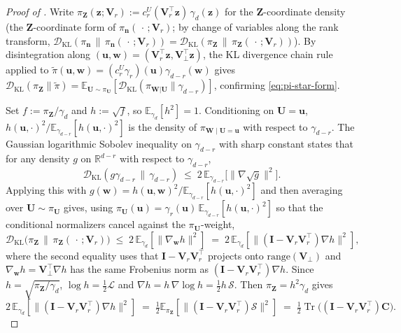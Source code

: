 \documentclass[review,hidelinks,onefignum,onetabnum]{siamart251216}
\newcommand{\RR}{\mathbb{R}}
\newcommand{\EE}{\mathbb{E}}
\newcommand{\DKL}{\mathcal{D}_{\mathrm{KL}}}
\newcommand{\tr}{\operatorname{Tr}}
\newcommand{\gauss}{\gamma}
\newcommand{\mC}{\bm{C}}
\newcommand{\mV}{\bm{V}}
\newcommand{\mI}{\bm{I}}
\newcommand{\vn}{\bm{n}}
\newcommand{\vz}{\bm{z}}
\newcommand{\vZ}{\bm{Z}}
\newcommand{\vu}{\bm{u}}
\newcommand{\vU}{\bm{U}}
\newcommand{\vw}{\bm{w}}
\newcommand{\vW}{\bm{W}}
\newcommand{\scL}{\mathcal{L}}
\newcommand{\scS}{\mathcal{S}}
\begin{document}
\begin{proof}[Proof of ]
Write $\pi_{\vZ}(\vz;\mV_r) := c_r^{U}(\mV_r^\top\vz)\,\gauss_d(\vz)$ for the $\vZ$-coordinate density (the $\vZ$-coordinate form of $\pi_{\vn}(\,\cdot\,;\mV_r)$; by change of variables along the rank transform, $\DKL(\pi_{\vn}\,\|\,\pi_{\vn}(\,\cdot\,;\mV_r)) = \DKL(\pi_{\vZ}\,\|\,\pi_{\vZ}(\,\cdot\,;\mV_r))$). By disintegration along $(\vu, \vw) = (\mV_r^\top\vz, \mV_\perp^\top\vz)$, the KL divergence chain rule applied to $\widetilde\pi(\vu, \vw) = (c_r^{U}\gauss_r)(\vu)\gauss_{d-r}(\vw)$ gives $\DKL(\pi_{\vZ}\|\widetilde\pi) = \EE_{\vU\sim\pi_{\vU}}[\DKL(\pi_{\vW|\vU}\|\gauss_{d-r})]$, confirming \eqref{eq:pi-star-form}.

Set $f := \pi_{\vZ}/\gauss_d$ and $h := \sqrt{f}$, so $\EE_{\gauss_d}[h^2] = 1$. Conditioning on $\vU = \vu$, $h(\vu, \cdot)^2 / \EE_{\gauss_{d-r}}[h(\vu,\cdot)^2]$ is the density of $\pi_{\vW\mid\vU=\vu}$ with respect to $\gauss_{d-r}$. The Gaussian logarithmic Sobolev inequality on $\gauss_{d-r}$ with sharp constant \cite[Prop.~5.5.1]{BakryGentilLedoux2014} states that for any density $g$ on $\RR^{d-r}$ with respect to $\gauss_{d-r}$,
\[
  \DKL(g\gauss_{d-r}\,\|\,\gauss_{d-r}) \;\le\; 2\,\EE_{\gauss_{d-r}}\bigl[\|\nabla\sqrt{g}\|^2\bigr].
\]
Applying this with $g(\vw) = h(\vu,\vw)^2/\EE_{\gauss_{d-r}}[h(\vu,\cdot)^2]$ and then averaging over $\vU \sim \pi_{\vU}$ gives, using $\pi_{\vU}(\vu) = \gauss_r(\vu)\,\EE_{\gauss_{d-r}}[h(\vu,\cdot)^2]$ so that the conditional normalizers cancel against the $\pi_{\vU}$-weight,
\[
  \DKL\bigl(\pi_{\vZ} \,\|\, \pi_{\vZ}(\,\cdot\,;\mV_r)\bigr)
  \;\leq\; 2\,\EE_{\gauss_d}[\|\nabla_{\vw} h\|^2]
  \;=\; 2\,\EE_{\gauss_d}[\|(\mI-\mV_r\mV_r^\top)\nabla h\|^2],
\]
where the second equality uses that $\mI-\mV_r\mV_r^\top$ projects onto $\mathrm{range}(\mV_\perp)$ and $\nabla_{\vw}h = \mV_\perp^\top\nabla h$ has the same Frobenius norm as $(\mI-\mV_r\mV_r^\top)\nabla h$. Since $h = \sqrt{\pi_{\vZ}/\gauss_d}$, $\log h = \tfrac12\scL$ and $\nabla h = h\,\nabla\log h = \tfrac12 h\,\scS$. Then $\pi_{\vZ} = h^2\gauss_d$ gives
\[
  2\,\EE_{\gauss_d}[\|(\mI-\mV_r\mV_r^\top)\nabla h\|^2] \;=\; \tfrac{1}{2}\EE_{\pi_{\vZ}}[\|(\mI-\mV_r\mV_r^\top)\scS\|^2] \;=\; \tfrac{1}{2}\tr\bigl((\mI-\mV_r\mV_r^\top)\mC\bigr).
\]
\end{proof}
\end{document}
